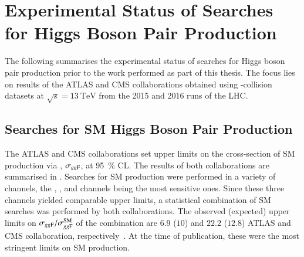 \section{Experimental Status of Searches for Higgs Boson Pair Production}%
\label{seq:experimental_status}

The following summarises the experimental status of searches for Higgs boson
pair production prior to the work performed as part of this thesis. The focus
lies on results of the ATLAS and CMS collaborations obtained using \pp-collision
datasets at $\sqrt{s} = \SI{13}{\TeV}$ from the 2015 and 2016 runs of the LHC.



\subsection{Searches for SM Higgs Boson Pair Production}%
\label{sec:past_results_smhh}


The ATLAS and CMS collaborations set upper limits on the cross-section of SM \HH
production via \ggF, $\sigma_{gg\text{F}}$, at \SI{95}{\percent} CL. The results of
both collaborations are summarised in . Searches for
SM \HH production were performed in a variety of channels, the \bbbb, \bbtautau,
and \bbyy channels being the most sensitive ones. Since these three channels
yielded comparable upper limits, a statistical combination of SM \HH searches
was performed by both collaborations. The observed (expected) upper limits on
$\sigma_{gg\text{F}} / \sigma_{gg\text{F}}^{\text{SM}}$ of the combination are $6.9$ ($10$)
and $22.2$ ($12.8$) ATLAS and CMS collaboration,
respectively~\cite{HDBS-2018-58,CMS-HIG-17-030}. At the time of publication,
these were the most stringent limits on SM \HH production.

